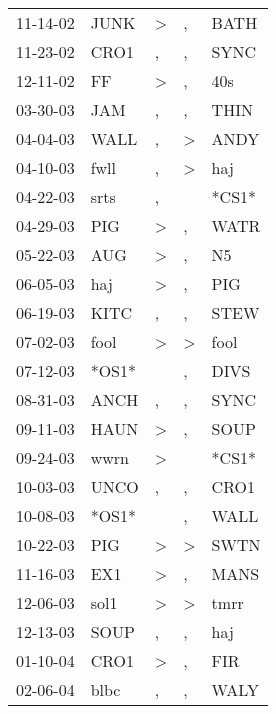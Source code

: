 \begin{supertabular}{lllll}
 11-14-02 &   JUNK &     \textgreater &                , &   BATH \\
 11-23-02 &   CRO1 &                , &                , &   SYNC \\
 12-11-02 &     FF &     \textgreater &                , &    40s \\
 03-30-03 &    JAM &                , &                , &   THIN \\
 04-04-03 &   WALL &                , &     \textgreater &   ANDY \\
 04-10-03 &   fwll &                , &     \textgreater &    haj \\
 04-22-03 &   srts &                , &                  &  *CS1* \\
 04-29-03 &    PIG &     \textgreater &                , &   WATR \\
 05-22-03 &    AUG &     \textgreater &                , &     N5 \\
 06-05-03 &    haj &     \textgreater &                , &    PIG \\
 06-19-03 &   KITC &                , &                , &   STEW \\
 07-02-03 &   fool &     \textgreater &     \textgreater &   fool \\
 07-12-03 &  *OS1* &                  &                , &   DIVS \\
 08-31-03 &   ANCH &                , &                , &   SYNC \\
 09-11-03 &   HAUN &     \textgreater &                , &   SOUP \\
 09-24-03 &   wwrn &     \textgreater &                  &  *CS1* \\
 10-03-03 &   UNCO &                , &                , &   CRO1 \\
 10-08-03 &  *OS1* &                  &                , &   WALL \\
 10-22-03 &    PIG &     \textgreater &     \textgreater &   SWTN \\
 11-16-03 &    EX1 &     \textgreater &                , &   MANS \\
 12-06-03 &   sol1 &     \textgreater &     \textgreater &   tmrr \\
 12-13-03 &   SOUP &                , &                , &    haj \\
 01-10-04 &   CRO1 &     \textgreater &                , &    FIR \\
 02-06-04 &   blbc &                , &                , &   WALY \\

\end{supertabular}

